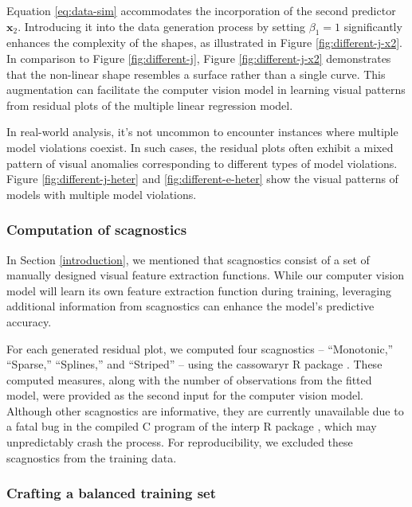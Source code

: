 \documentclass[]{interact}
\theoremstyle{plain}%
\theoremstyle{definition}
\theoremstyle{remark}
\begin{document}
Equation \ref{eq:data-sim} accommodates the incorporation of the second
predictor \(\boldsymbol{x}_2\). Introducing it into the data generation
process by setting \(\beta_1 = 1\) significantly enhances the complexity
of the shapes, as illustrated in Figure \ref{fig:different-j-x2}. In
comparison to Figure \ref{fig:different-j}, Figure
\ref{fig:different-j-x2} demonstrates that the non-linear shape
resembles a surface rather than a single curve. This augmentation can
facilitate the computer vision model in learning visual patterns from
residual plots of the multiple linear regression model.

In real-world analysis, it's not uncommon to encounter instances where
multiple model violations coexist. In such cases, the residual plots
often exhibit a mixed pattern of visual anomalies corresponding to
different types of model violations. Figure \ref{fig:different-j-heter}
and \ref{fig:different-e-heter} show the visual patterns of models with
multiple model violations.

\hypertarget{computation-of-scagnostics}{%
\subsubsection{Computation of
scagnostics}\label{computation-of-scagnostics}}

In Section \ref{introduction}, we mentioned that scagnostics consist of
a set of manually designed visual feature extraction functions. While
our computer vision model will learn its own feature extraction function
during training, leveraging additional information from scagnostics can
enhance the model's predictive accuracy.

For each generated residual plot, we computed four scagnostics --
``Monotonic,'' ``Sparse,'' ``Splines,'' and ``Striped'' -- using the
cassowaryr R package \citep{mason2022cassowaryr}. These computed
measures, along with the number of observations from the fitted model,
were provided as the second input for the computer vision model.
Although other scagnostics are informative, they are currently
unavailable due to a fatal bug in the compiled C program of the interp R
package \citep{Albrecht2023interp}, which may unpredictably crash the
process. For reproducibility, we excluded these scagnostics from the
training data.

\hypertarget{crafting-a-balanced-training-set}{%
\subsubsection{Crafting a balanced training
set}\label{crafting-a-balanced-training-set}}
\end{document}
